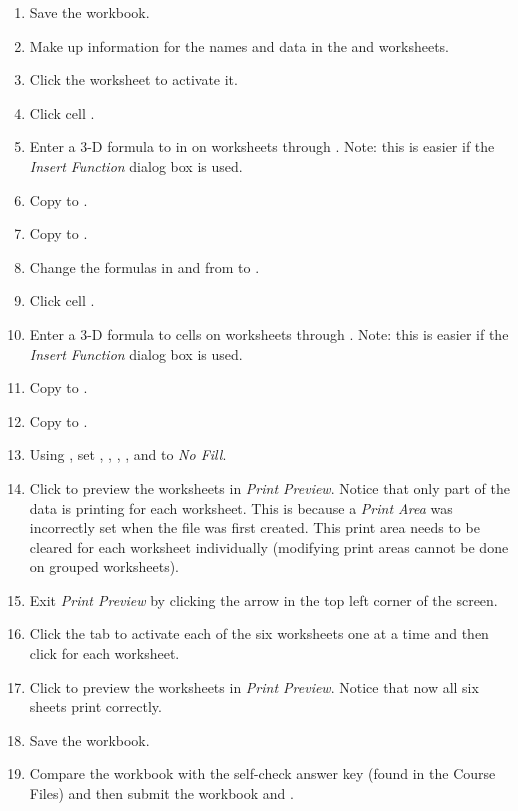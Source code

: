 \begin{enumerate}[resume]
	\item Save the  workbook.
	\item Make up information for the names and data in the  and  worksheets.
	\item Click the  worksheet to activate it.

	\item Click cell . 
	\item Enter a $ 3 $-D formula to  in  on worksheets  through . Note: this is easier if the \textit{Insert Function} dialog box is used.
	\item Copy  to .
	\item Copy  to .
	\item Change the formulas in  and  from  to .
	\item Click cell . 
	\item Enter a $ 3 $-D formula to  cells  on worksheets  through . Note: this is easier if the \textit{Insert Function} dialog box is used.
	\item Copy  to .
	\item Copy  to .
	\item Using , set , , , , and  to \textit{No Fill}. 
	\item Click  to preview the worksheets in \textit{Print Preview}. Notice that only part of the data is printing for each worksheet. This is because a \textit{Print Area} was incorrectly set when the file was first created. This print area needs to be cleared for each worksheet individually (modifying print areas cannot be done on grouped worksheets). 
	\item Exit \textit{Print Preview} by clicking the arrow in the top left corner of the screen. 
	\item Click the tab to activate each of the six worksheets one at a time and then click  for each worksheet.
	\item Click  to preview the worksheets in \textit{Print Preview}. Notice that now all six sheets print correctly.
	\item Save the  workbook.
	\item Compare the workbook with the self-check answer key (found in the Course Files) and then submit the  workbook and .
\end{enumerate}

